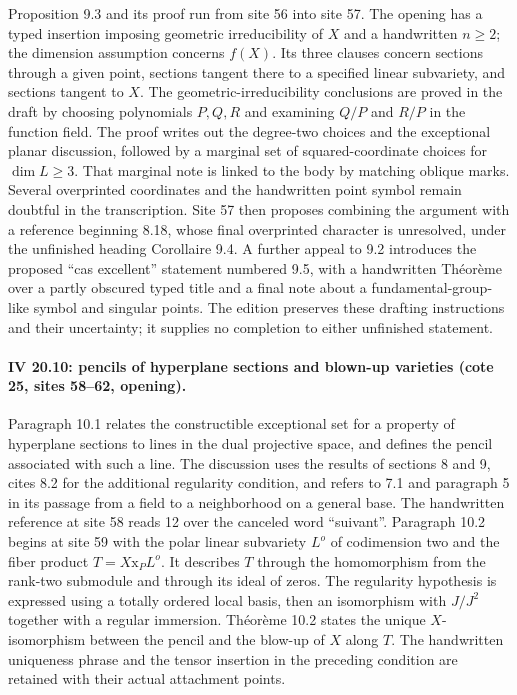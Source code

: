 \documentclass[10pt,a4paper]{article}
\begin{document}
Proposition 9.3 and its proof run from site 56 into site 57. The opening has a typed insertion imposing geometric irreducibility of $X$ and a handwritten $n\geq2$; the dimension assumption concerns $f(X)$. Its three clauses concern sections through a given point, sections tangent there to a specified linear subvariety, and sections tangent to $X$. The geometric-irreducibility conclusions are proved in the draft by choosing polynomials $P,Q,R$ and examining $Q/P$ and $R/P$ in the function field. The proof writes out the degree-two choices and the exceptional planar discussion, followed by a marginal set of squared-coordinate choices for $\dim L\geq3$. That marginal note is linked to the body by matching oblique marks. Several overprinted coordinates and the handwritten point symbol remain doubtful in the transcription. Site 57 then proposes combining the argument with a reference beginning 8.18, whose final overprinted character is unresolved, under the unfinished heading Corollaire 9.4. A further appeal to 9.2 introduces the proposed ``cas excellent'' statement numbered 9.5, with a handwritten Th\'eor\`eme over a partly obscured typed title and a final note about a fundamental-group-like symbol and singular points. The edition preserves these drafting instructions and their uncertainty; it supplies no completion to either unfinished statement.
\par{}

\par{}
\paragraph{IV 20.10: pencils of hyperplane sections and blown-up varieties (cote 25, sites 58--62, opening).}
Paragraph 10.1 relates the constructible exceptional set for a property of hyperplane sections to lines in the dual projective space, and defines the pencil associated with such a line. The discussion uses the results of sections 8 and 9, cites 8.2 for the additional regularity condition, and refers to 7.1 and paragraph 5 in its passage from a field to a neighborhood on a general base. The handwritten reference at site 58 reads 12 over the canceled word ``suivant''. Paragraph 10.2 begins at site 59 with the polar linear subvariety $L^o$ of codimension two and the fiber product $T=X\mathbin{\mathrm x}_P L^o$. It describes $T$ through the homomorphism from the rank-two submodule and through its ideal of zeros. The regularity hypothesis is expressed using a totally ordered local basis, then an isomorphism with $J/J^2$ together with a regular immersion. Th\'eor\`eme 10.2 states the unique $X$-isomorphism between the pencil and the blow-up of $X$ along $T$. The handwritten uniqueness phrase and the tensor insertion in the preceding condition are retained with their actual attachment points.
\end{document}
